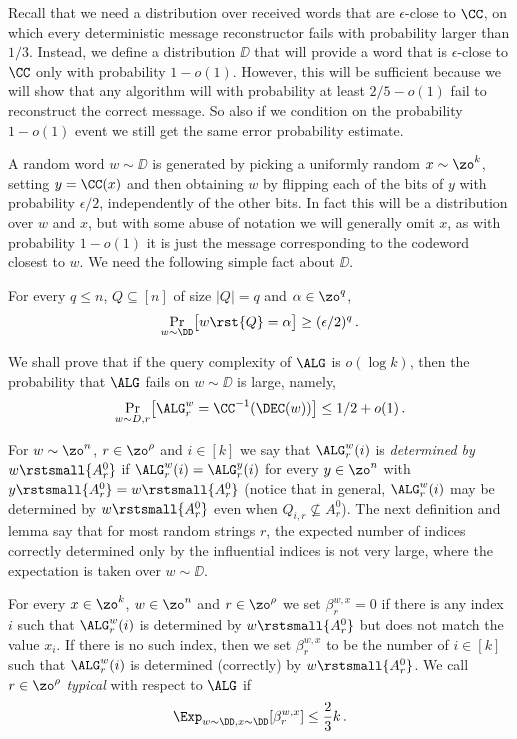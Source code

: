 %

%
Recall that we need a distribution over received words that are $\epsilon$-close to $\CC$, on which every deterministic message reconstructor fails with probability larger than $1/3$. Instead, we define a distribution $\DD$ that will provide a word that is $\epsilon$-close to $\CC$ only with probability $1-o(1)$. However, this will be sufficient because we will show that any algorithm will with probability at least $2/5-o(1)$ fail to reconstruct the correct message. So also if we condition on the probability $1-o(1)$ event we still get the same error probability estimate.

A random word $w\sim\DD$ is generated by picking a uniformly random $x\sim\zo^k$, setting $y=\CC(x)$ and then obtaining $w$ by flipping each of the bits of $y$ with probability $\epsilon/2$, independently of the other bits. In fact this will be a distribution over $w$ and $x$, but with some abuse of notation we will generally omit $x$, as with probability $1-o(1)$ it is just the message corresponding to the codeword closest to $w$.
We need the following simple fact about $\DD$.

%
%
%
%
%
%
%
%
\begin{fact}\label{lem:fact}
%
 For every $q \leq n$, 
$Q \subseteq [n]$ of size $|Q|=q$ and
 $\alpha \in \zo^q$,
\[
\Pr_{w \sim \DD}\bigl[w\rst{Q} = \alpha\bigr] \geq
 (\epsilon/2)^q\,.
\]
\end{fact}
%

We shall prove that if the query complexity of $\ALG$ is $o(\log k)$,
then the probability that $\ALG$ fails on $w \sim \DD$ is large,
namely,
\[
\Pr_{w \sim D, r}\bigl[\ALG^w_r = \CC^{-1}(\DEC(w))\bigr] \leq 1/2 + o(1)\,.
\]

For $w \sim \zo^n$, $r \in \zo^\rho$ and $i \in [k]$ we say that $\ALG^w_r(i)$ is \emph{determined by $w\rstsmall{A_r^0}$} if $\ALG^w_r(i) = \ALG^{y}_r(i)$ for every $y \in \zo^n$ with $y\rstsmall{A_r^0} = w\rstsmall{A_r^0}$ (notice that in general, $\ALG^w_r(i)$ may be determined by $w\rstsmall{A_r^0}$ even when $Q_{i,r} \nsubseteq A_r^0$). The next definition and lemma say that for most random strings $r$, the expected number of indices correctly determined only by the influential indices is not very large, where the expectation is taken over $w \sim \DD$.
\begin{definition}
For every $x\in\zo^k$, $w\in \zo^n$ and $r \in \zo^\rho$ we set
$\beta_r^{w,x}=0$ if there is any index $i$ such that $\ALG^w_r(i)$ is
determined by $w\rstsmall{A_r^0}$ but does not match the value $x_i$. If
there is no such index, then we set $\beta_r^{w,x}$ to be the number
of $i\in [k]$ such that  $\ALG^w_r(i)$ is determined (correctly) by
$w\rstsmall{A_r^0}$. We call $r\in\zo^\rho$ \emph{typical} with respect to
$\ALG$ if
\[
\Exp_{w\sim \DD,x\sim\DD}[\beta_r^{w,x}]\leq\frac23k\,.
\]
\end{definition}

